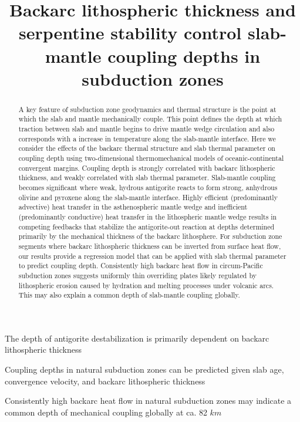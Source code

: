 \documentclass[draft]{agujournal2019}
\begin{document}
\title{Backarc lithospheric thickness and serpentine stability control slab-mantle coupling depths in subduction zones}

\begin{keypoints}
 \item The depth of antigorite destabilization is primarily dependent on backarc lithospheric thickness
 \item Coupling depths in natural subduction zones can be predicted given slab age, convergence velocity, and backarc lithospheric thickness
 \item Consistently high backarc heat flow in natural subduction zones may indicate a common depth of mechanical coupling globally at ca. 82 $km$
\end{keypoints}

\begin{abstract}
 A key feature of subduction zone geodynamics and thermal structure is the point at which the slab and mantle mechanically couple. This point defines the depth at which traction between slab and mantle begins to drive mantle wedge circulation and also corresponds with a  increase in temperature along the slab-mantle interface. Here we consider the effects of the backarc thermal structure and slab thermal parameter on coupling depth using two-dimensional thermomechanical models of oceanic-continental convergent margins. Coupling depth is strongly correlated with backarc lithospheric thickness, and weakly correlated with slab thermal parameter. Slab-mantle coupling becomes significant where weak, hydrous antigorite reacts to form strong, anhydrous olivine and pyroxene along the slab-mantle interface. Highly efficient (predominantly advective) heat transfer in the asthenospheric mantle wedge and inefficient (predominantly conductive) heat transfer in the lithospheric mantle wedge results in competing feedbacks that stabilize the antigorite-out reaction at depths determined primarily by the mechanical thickness of the backarc lithosphere. For subduction zone segments where backarc lithospheric thickness can be inverted from surface heat flow, our results provide a regression model that can be applied with slab thermal parameter to predict coupling depth. Consistently high backarc heat flow in circum-Pacific subduction zones suggests uniformly thin overriding plates likely regulated by lithospheric erosion caused by hydration and melting processes under volcanic arcs. This may also explain a common depth of slab-mantle coupling globally.
\end{abstract}
\end{document}
